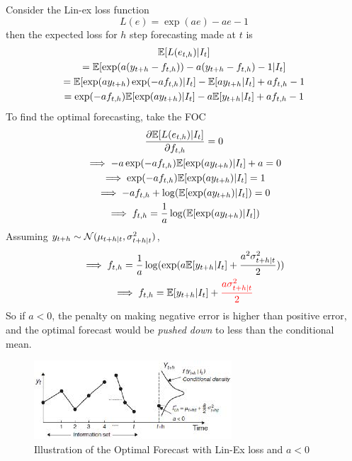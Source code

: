 \documentclass[11pt]{article}
\begin{document}
			\begin{example}
				Consider the Lin-ex loss function
				\begin{equation}
					L(e) = \exp(ae) - ae - 1
				\end{equation}
				then the expected loss for $h$ step forecasting made at $t$ is 
				\begin{gather}
					\mathbb{E}[{L(e_{t,h})|I_t}] \\
					= \mathbb{E}[{\exp(a(y_{t+h} - f_{t,h})) - a(y_{t+h} - f_{t,h}) - 1|I_t}] \\
					= \mathbb{E}[{\exp(a y_{t+h}) \exp(-a f_{t,h})|I_t}] - \mathbb{E}[{a y_{t+h}|I_t}] + a f_{t,h} - 1 \\ 
					= \exp(-a f_{t,h}) \mathbb{E}[{\exp(a y_{t+h})|I_t}] - a \mathbb{E}[{y_{t+h}|I_t}] + a f_{t,h} - 1 \\
				\end{gather}
				To find the optimal forecasting, take the FOC
				\begin{gather}
					\frac{\partial{\mathbb{E}[{L(e_{t,h})|I_t}]}}{\partial{f_{t,h}}} = 0\\
					\implies -a \exp(-a f_{t,h}) \mathbb{E}[{\exp(a y_{t+h})|I_t}] + a = 0 \\
					\implies \exp(-a f_{t, h}) \mathbb{E}[{\exp(a y_{t+h})|I_t}] = 1 \\
					\implies - a f_{t, h} + \log(\mathbb{E}[{\exp(a y_{t+h})|I_t}]) = 0 \\
					\implies f_{t, h} = \frac{1}{a} \log(\mathbb{E}[{\exp(a y_{t+h})|I_t}])
				\end{gather}
				Assuming $y_{t+h} \sim \mathcal{{N}}(\mu_{t+h|t}, \sigma_{t+h|t}^2)$, 
				\begin{gather}
					\implies f_{t, h} = \frac{1}{a} \log(\exp(
						a \mathbb{E}[{y_{t+h}|I_t}] + \frac{a^2 \sigma_{t+h|t}^2}{2}
					)) \\
					\implies f_{t, h} = \mathbb{E}[{y_{t+h}|I_t}] + \textcolor{red}{\frac{a \sigma^2_{t+h|t}}{2}}
				\end{gather} 
				So if $a < 0$, the penalty on making negative error is higher than positive error, and the optimal forecast would be \emph{pushed down} to less than the conditional mean.
				\begin{figure}[H]
					\centering
					\includegraphics{figures/asym_loss_forecast}
					\caption{Illustration of the Optimal Forecast with Lin-Ex loss and $a < 0$}
				\end{figure}

\end{example}
\end{document}
